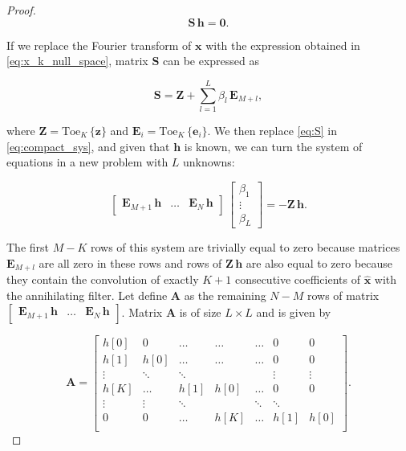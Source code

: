 \documentclass{article}
\def\x{{\bm x}}
\def\bhx{\bm{\hat{x}}}
\def\z{{\bm z}}
\def\A{{\bm A}}
\providecommand{\toe}[2]{\text{Toe}_{#2}\,\lbrace#1\rbrace}
\begin{document}
\begin{proof}
\begin{equation}
\bm{S} \, \bm{h} = \bm{0}.
\label{eq:compact_sys}
\end{equation}

If we replace the Fourier transform of $\x$ with the expression obtained in \eqref{eq:x_k_null_space},
matrix $\bm{S}$ can be expressed as

\begin{equation}
\bm{S} = \bm{Z} + \sum_{l=1}^{L} \beta_l \, \bm{E}_{M+l},
\label{eq:S}
\end{equation}

\noindent
where $\bm{Z} = \toe{\z}{K}$ and $\bm{E}_i = \toe{\bm{e}_i}{K}$. We then replace \eqref{eq:S} in 
\eqref{eq:compact_sys}, and given that $\bm{h}$ is known, we can turn the system of 
equations in a new problem with $L$ unknowns:

\begin{equation}
\begin{bmatrix}
\bm{E}_{M+1} \, \bm{h} & \ldots & \bm{E}_{N} \, \bm{h}
\end{bmatrix}
\,
\begin{bmatrix}
\beta_1\\
\vdots\\
\beta_L
\end{bmatrix}
=
- \bm{Z} \, \bm{h}.
\label{eq:system_beta}
\end{equation}

The first $M-K$ rows of this system are trivially equal to zero because matrices $\bm{E}_{M+l}$
are all zero in these rows and rows of $\bm{Z}\,\bm{h}$ are also equal to zero because
they contain the convolution of exactly $K+1$ consecutive coefficients of $\bhx$ with 
the annihilating filter.  
Let define $\A$ as the remaining $N-M$ rows of matrix 
$\begin{bmatrix} \bm{E}_{M+1} \, \bm{h} & \ldots & \bm{E}_{N} \, \bm{h} \end{bmatrix}$.
Matrix $\A$ is of size $L\times L$ and is given by

\begin{equation}
\bm{A} = 
\begin{bmatrix}
h[0]   & 0      & \ldots & \ldots & \ldots & 0      & 0      \\
h[1]   & h[0]   & \ldots & \ldots & \ldots & 0      & 0      \\
\vdots & \ddots & \ddots &        &        & \vdots & \vdots \\
h[K]   & \ldots & h[1]   & h[0]   & \ldots & 0      & 0      \\
\vdots & \vdots & \ddots &        & \ddots & \ddots &        \\
0      & 0      & \ldots & h[K]   & \ldots & h[1]   & h[0]   \\
\end{bmatrix}.
\end{equation}


\end{proof}
\end{document}
